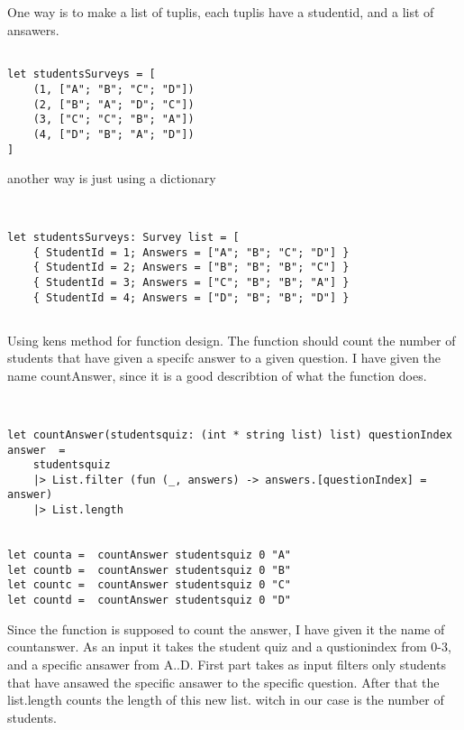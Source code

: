 \documentclass{article}
\begin{document}
\subsection{}
One way is to make a list of tuplis, each tuplis have a studentid, and a list of ansawers.

    \begin{lstlisting}

let studentsSurveys = [
    (1, ["A"; "B"; "C"; "D"])
    (2, ["B"; "A"; "D"; "C"])
    (3, ["C"; "C"; "B"; "A"])
    (4, ["D"; "B"; "A"; "D"])
]

    \end{lstlisting}


another way is just using a dictionary


    \begin{lstlisting}


let studentsSurveys: Survey list = [
    { StudentId = 1; Answers = ["A"; "B"; "C"; "D"] }
    { StudentId = 2; Answers = ["B"; "B"; "B"; "C"] }
    { StudentId = 3; Answers = ["C"; "B"; "B"; "A"] }
    { StudentId = 4; Answers = ["D"; "B"; "B"; "D"] }

    \end{lstlisting}





\subsection{}

Using kens method for function design. The function should count the number of students that have given a specifc answer to a given question. I have given the name countAnswer, since it is a good describtion of what the function does.


 \begin{lstlisting}


let countAnswer(studentsquiz: (int * string list) list) questionIndex answer  = 
    studentsquiz
    |> List.filter (fun (_, answers) -> answers.[questionIndex] = answer)
    |> List.length 


let counta =  countAnswer studentsquiz 0 "A"
let countb =  countAnswer studentsquiz 0 "B"
let countc =  countAnswer studentsquiz 0 "C"
let countd =  countAnswer studentsquiz 0 "D"

    \end{lstlisting}

Since the function is supposed to count the answer, I have given it the name of countanswer. As an input it takes the student quiz and a qustionindex from 0-3, and a specific ansawer from A..D. First part takes as input  filters only students that have ansawed the specific ansawer to the specific question. After that the list.length counts the length of this new list. witch in our case is the number of students.
\end{document}
